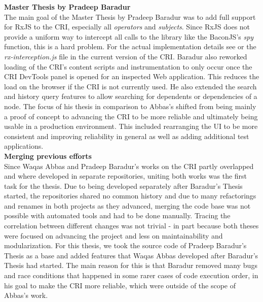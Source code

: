 	\textbf{Master Thesis by Pradeep Baradur}\\
	 \cite{ThesisBaradur} The main goal of the Master Thesis by Pradeep Baradur was to add full support for RxJS to the CRI, especially all \emph{operators} and \emph{subjects}. Since RxJS does not provide a uniform way to intercept all calls to the library like the BaconJS's \emph{spy} function, this is a hard problem. For the actual implementation details see \cite{ThesisBaradur} or the \emph{rx-interception.js} file in the current version of the CRI. Baradur also reworked loading of the CRI's content scripts and instrumentation to only occur once the CRI DevTools panel is opened for an inspected Web application. This reduces the load on the browser if the CRI is not currently used. He also extended the search and history query features to allow searching for dependents or dependencies of a node. The focus of his thesis in comparison to Abbas's shifted from being mainly a proof of concept to advancing the CRI to be more reliable and ultimately being usable in a production environment. This included rearranging the UI to be more consistent and improving reliability in general as well as adding additional test applications.\\		
		
	\textbf{Merging previous efforts}\\
	Since Waqas Abbas and Pradeep Baradur's works on the CRI partly overlapped and where developed in separate repositories, uniting both works was the first task for the thesis. Due to being developed separately after Baradur's Thesis started, the repositories shared no common history and due to many refactorings and renames in both projects as they advanced, merging the code base was not possible with automated tools and had to be done manually. Tracing the correlation between different changes was not trivial - in part because both theses were focused on advancing the project and less on maintainability and modularization. For this thesis, we took the source code of Pradeep Baradur's Thesis as a base and added features that Waqas Abbas developed after Baradur's Thesis had started. The main reason for this is that Baradur removed many bugs and race conditions that happened in some rarer cases of code execution order, in his goal to make the CRI more reliable, which were outside of the scope of Abbas's work.
		

